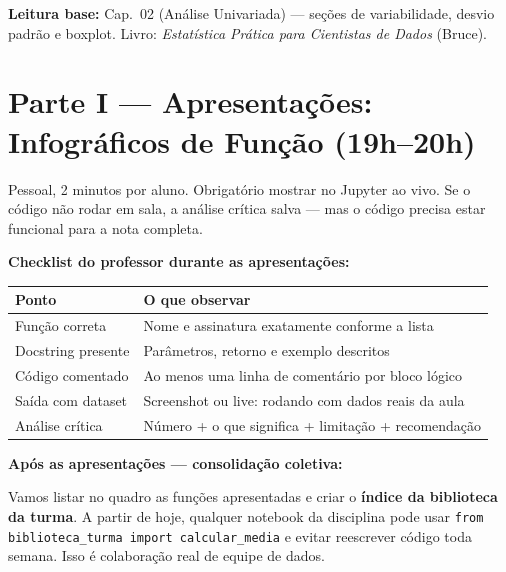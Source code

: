 \begin{NoteBox}
\textbf{Leitura base:} Cap.\ 02 (Análise Univariada) — seções de variabilidade,
desvio padrão e boxplot. Livro: \textit{Estatística Prática para Cientistas de Dados} (Bruce).
\end{NoteBox}

\section{Parte I — Apresentações: Infográficos de Função (19h–20h)}

Pessoal, 2 minutos por aluno. Obrigatório mostrar no Jupyter ao vivo. Se o
código não rodar em sala, a análise crítica salva — mas o código precisa
estar funcional para a nota completa.

\begin{BoardBox}
\textbf{Checklist do professor durante as apresentações:}
\begin{tabular}{|p{4cm}|p{9cm}|}
\hline
\textbf{Ponto} & \textbf{O que observar} \\
\hline
Função correta      & Nome e assinatura exatamente conforme a lista \\
Docstring presente  & Parâmetros, retorno e exemplo descritos \\
Código comentado    & Ao menos uma linha de comentário por bloco lógico \\
Saída com dataset   & Screenshot ou live: rodando com dados reais da aula \\
Análise crítica     & Número + o que significa + limitação + recomendação \\
\hline
\end{tabular}
\end{BoardBox}

\begin{SolvedBox}
\textbf{Após as apresentações — consolidação coletiva:}

Vamos listar no quadro as funções apresentadas e criar o
\textbf{índice da biblioteca da turma}. A partir de hoje,
qualquer notebook da disciplina pode usar \texttt{from biblioteca\_turma import calcular\_media}
e evitar reescrever código toda semana. Isso é colaboração real de
equipe de dados.
\end{SolvedBox}

